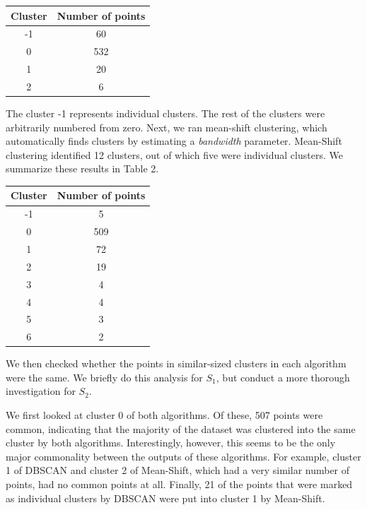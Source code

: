 \documentclass[12pt,a4paper,twocolumn]{article}
\begin{document}
	\begin{tabular}{|c|c|}
		\hline 
		\textbf{Cluster} & \textbf{Number of points} \\ 
		\hline 
		-1 & 60 \\ 
		\hline 
		0 & 532 \\ 
		\hline 
		1 & 20 \\ 
		\hline 
		2 & 6 \\ 
		\hline 
	\end{tabular}
	\begingroup
	\endgroup
	\hfill\break
	
	The cluster -1 represents individual clusters. The rest of the clusters were arbitrarily numbered from zero. Next, we ran mean-shift clustering, which automatically finds clusters by estimating a \textit{bandwidth} parameter. Mean-Shift clustering identified 12 clusters, out of which five were individual clusters. We summarize these results in Table 2.\\
	
	\begin{tabular}{|c|c|}
		\hline 
		\textbf{Cluster} & \textbf{Number of points} \\ 
		\hline 
		-1 & 5 \\ 
		\hline 
		0 & 509 \\ 
		\hline 
		1 & 72 \\ 
		\hline 
		2 & 19 \\ 
		\hline 
		3 & 4 \\ 
		\hline 
		4 & 4 \\ 
		\hline 
		5 & 3 \\ 
		\hline 
		6 & 2 \\ 
		\hline 
	\end{tabular}
	\begingroup
	\endgroup
	\hfill\break
	
	We then checked whether the points in similar-sized clusters in each algorithm were the same. We briefly do this analysis for $S_1$, but conduct a more thorough investigation for $S_2$.
	
	We first looked at cluster 0 of both algorithms. Of these, 507 points were common, indicating that the majority of the dataset was clustered into the same cluster by both algorithms. Interestingly, however, this seems to be the only major commonality between the outputs of these algorithms. For example, cluster 1 of DBSCAN and cluster 2 of Mean-Shift, which had a very similar number of points, had no common points at all. Finally, 21 of the points that were marked as individual clusters by DBSCAN were put into cluster 1 by Mean-Shift.
	
\end{document}
